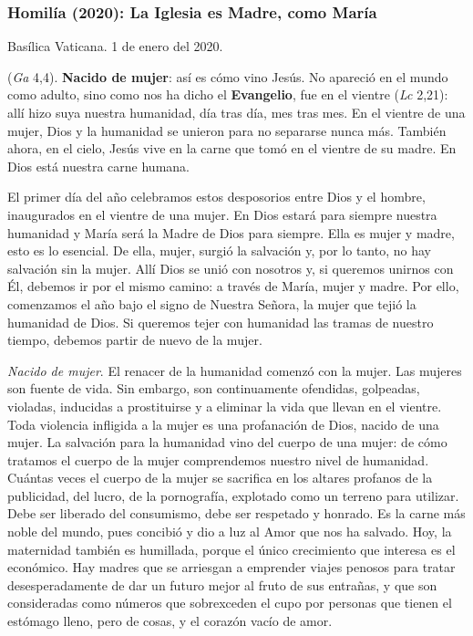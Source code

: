 \begin{body}
\begin{body}
\subsubsection{Homilía (2020): La Iglesia es Madre, como María}

Basílica Vaticana. 1 de enero del 2020.

 (\emph{Ga} 4,4). \textbf{Nacido de mujer}: así es cómo vino Jesús. No apareció en el mundo como adulto, sino como nos ha dicho el \textbf{Evangelio}, fue  en el vientre (\emph{Lc} 2,21): allí hizo suya nuestra humanidad, día tras día, mes tras mes. En el vientre de una mujer, Dios y la humanidad se unieron para no separarse nunca más. También ahora, en el cielo, Jesús vive en la carne que tomó en el vientre de su madre. En Dios está nuestra carne humana.

El primer día del año celebramos estos desposorios entre Dios y el hombre, inaugurados en el vientre de una mujer. En Dios estará para siempre nuestra humanidad y María será la Madre de Dios para siempre. Ella es mujer y madre, esto es lo esencial. De ella, mujer, surgió la salvación y, por lo tanto, no hay salvación sin la mujer. Allí Dios se unió con nosotros y, si queremos unirnos con Él, debemos ir por el mismo camino: a través de María, mujer y madre. Por ello, comenzamos el año bajo el signo de Nuestra Señora, la mujer que tejió la humanidad de Dios. Si queremos tejer con humanidad las tramas de nuestro tiempo, debemos partir de nuevo de la mujer.

\emph{Nacido de mujer}. El renacer de la humanidad comenzó con la mujer. Las mujeres son fuente de vida. Sin embargo, son continuamente ofendidas, golpeadas, violadas, inducidas a prostituirse y a eliminar la vida que llevan en el vientre. Toda violencia infligida a la mujer es una profanación de Dios, nacido de una mujer. La salvación para la humanidad vino del cuerpo de una mujer: de cómo tratamos el cuerpo de la mujer comprendemos nuestro nivel de humanidad. Cuántas veces el cuerpo de la mujer se sacrifica en los altares profanos de la publicidad, del lucro, de la pornografía, explotado como un terreno para utilizar. Debe ser liberado del consumismo, debe ser respetado y honrado. Es la carne más noble del mundo, pues concibió y dio a luz al Amor que nos ha salvado. Hoy, la maternidad también es humillada, porque el único crecimiento que interesa es el económico. Hay madres que se arriesgan a emprender viajes penosos para tratar desesperadamente de dar un futuro mejor al fruto de sus entrañas, y que son consideradas como números que sobrexceden el cupo por personas que tienen el estómago lleno, pero de cosas, y el corazón vacío de amor.


\end{body}
\end{body}
